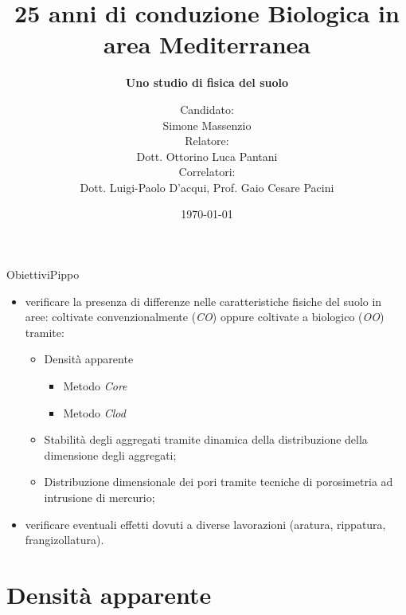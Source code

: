 \documentclass[10pt]{beamer}
\title[] %
{ %
  \textbf{25 anni di conduzione Biologica in area Mediterranea}
}
\subtitle[Uno studio di fisica del suolo]
{
  \textbf{Uno studio di fisica del suolo}
}
\author[Simone Massenzio]
{ 
  Candidato: \\Simone Massenzio \\
  Relatore: \\Dott. Ottorino Luca Pantani\\
  Correlatori:\\
  Dott. Luigi-Paolo D'acqui, Prof. Gaio Cesare Pacini}
\institute[] { \emph{Dipartimento di Scienze della Produzioni Animali e
    dell'Ambiente\\
    Universit\`a degli studi di Firenze - UniFI\\}
  
}
\date{\today}
\begin{document}
{\1
  \begin{frame}[noframenumbering]%
    \titlepage
  \end{frame}}







\begin{frame}{Obiettivi}{Pippo}
  \large
  \begin{itemize}[<+->]
  \item verificare la presenza di differenze nelle caratteristiche
    fisiche del suolo in aree: coltivate convenzionalmente (\emph{CO})
    oppure coltivate a biologico (\emph{OO}) tramite:
    \begin{itemize}
    \item Densit\`a apparente
      \begin{itemize}
      \item Metodo \emph{Core}
      \item Metodo \emph{Clod}
      \end{itemize}
    \item Stabilit\`a degli aggregati tramite dinamica della
      distribuzione della dimensione degli aggregati;
    \item Distribuzione dimensionale dei pori tramite tecniche di
      porosimetria ad intrusione di mercurio;      
    \end{itemize}
  \item verificare eventuali effetti dovuti a diverse lavorazioni
    (aratura, rippatura, frangizollatura).
  \end{itemize}
\end{frame}

\section{Densit\`a apparente}
\end{document}
